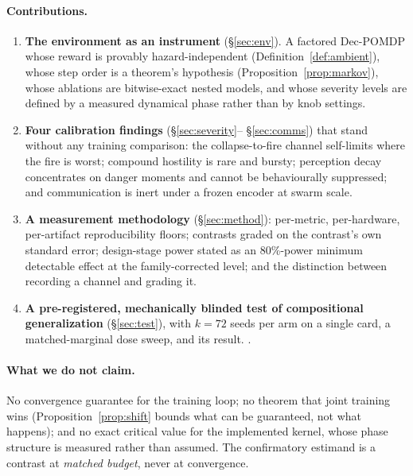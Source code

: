 \paragraph{Contributions.}
\begin{enumerate}[leftmargin=*,itemsep=2pt]
  \item \textbf{The environment as an instrument} (\S\ref{sec:env}). A
  factored Dec-POMDP whose reward is provably hazard-independent
  (Definition~\ref{def:ambient}), whose step order is a theorem's hypothesis
  (Proposition~\ref{prop:markov}), whose ablations are bitwise-exact nested
  models, and whose severity levels are defined by a measured dynamical phase
  rather than by knob settings.
  \item \textbf{Four calibration findings} (\S\ref{sec:severity}--%
  \S\ref{sec:comms}) that stand without any training comparison: the
  collapse-to-fire channel self-limits where the fire is worst; compound
  hostility is rare and bursty; perception decay concentrates on danger
  moments and cannot be behaviourally suppressed; and communication is inert
  under a frozen encoder at swarm scale.
  \item \textbf{A measurement methodology} (\S\ref{sec:method}): per-metric,
  per-hardware, per-artifact reproducibility floors; contrasts graded on the
  contrast's own standard error; design-stage power stated as an 80\%-power
  minimum detectable effect at the family-corrected level; and the
  distinction between recording a channel and grading it.
  \item \textbf{A pre-registered, mechanically blinded test of compositional
  generalization} (\S\ref{sec:test}), with $k = 72$ seeds per arm on a single
  card, a matched-marginal dose sweep, and its result. .
\end{enumerate}

\paragraph{What we do not claim.}
No convergence guarantee for the training loop; no theorem that joint
training wins (Proposition~\ref{prop:shift} bounds what can be guaranteed,
not what happens); and no exact critical value for the implemented kernel,
whose phase structure is measured rather than assumed. The confirmatory
estimand is a contrast at \emph{matched budget}, never at convergence.
